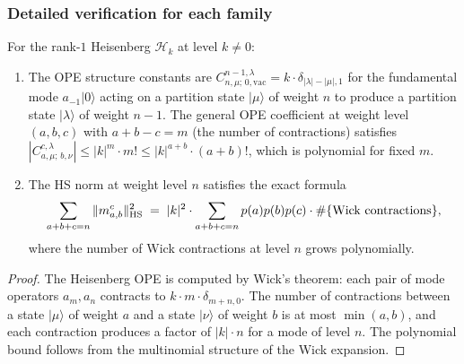 \subsubsection{Detailed verification for each family}

\begin{proposition}
\label{prop:thqg-I-heisenberg-detail}
For the rank-$1$ Heisenberg $\mathcal{H}_k$ at level $k \neq 0$:
\begin{enumerate}[label=\textup{(\roman*)}]
\item The OPE structure constants are $C^{n-1,\lambda}_{n,\mu;\,0,\mathrm{vac}} = k \cdot \delta_{|\lambda|-|\mu|,1}$ for the fundamental mode $a_{-1}|0\rangle$ acting on a partition state $|\mu\rangle$ of weight $n$ to produce a partition state $|\lambda\rangle$ of weight $n-1$. The general OPE coefficient at weight level $(a,b,c)$ with $a+b-c = m$ (the number of contractions) satisfies $|C^{c,\lambda}_{a,\mu;\,b,\nu}| \leq |k|^m \cdot m! \leq |k|^{a+b} \cdot (a+b)!$, which is polynomial for fixed $m$.
\item The HS norm at weight level $n$ satisfies the exact formula
 \begin{equation}\label{eq:thqg-I-heisenberg-exact-hs}
 \sum_{\substack{a+b+c = n}} \|m^c_{a,b}\|_{\operatorname{HS}}^2 \;=\; |k|^2 \cdot \sum_{\substack{a+b+c=n}} p(a)p(b)p(c) \cdot \#\{\text{Wick contractions}\},
 \end{equation}
 where the number of Wick contractions at level $n$ grows polynomially.
\end{enumerate}
\end{proposition}

\begin{proof}
The Heisenberg OPE is computed by Wick's theorem: each pair of mode operators $a_m, a_n$ contracts to $k \cdot m \cdot \delta_{m+n,0}$. The number of contractions between a state $|\mu\rangle$ of weight $a$ and a state $|\nu\rangle$ of weight $b$ is at most $\min(a,b)$, and each contraction produces a factor of $|k| \cdot n$ for a mode of level $n$. The polynomial bound follows from the multinomial structure of the Wick expansion.
\end{proof}

